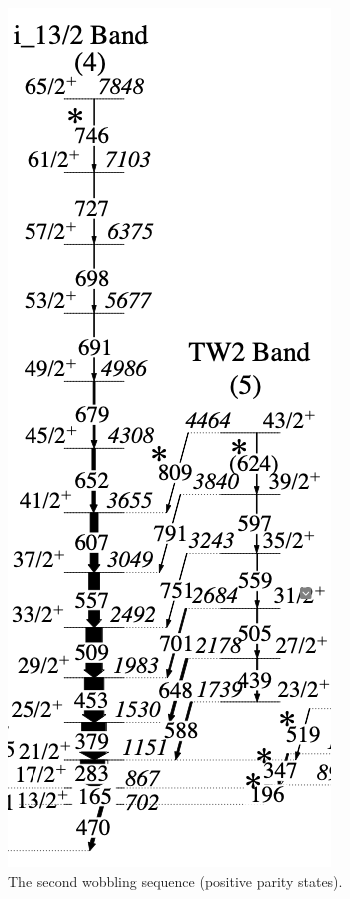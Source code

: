 \documentclass{beamer}
\begin{document}
\begin{frame}
\begin{columns}[c]
\begin{figure}
         \centering
         \includegraphics[scale=0.15]{figs/positive_Au183.png}
         \caption{The second wobbling sequence (positive parity states).}
         \label{au183positive}
     \end{figure}
    \end{columns}
\end{frame}
\end{document}
